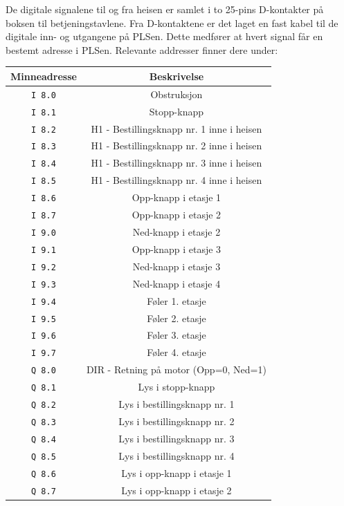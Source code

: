 \begin{alphasection}
De digitale signalene til og fra heisen er samlet i to 25-pins D-kontakter på boksen til
betjeningstavlene. Fra D-kontaktene er det laget en fast kabel til de digitale inn- og utgangene
på PLSen. Dette medfører at hvert signal får en bestemt adresse i PLSen. Relevante addresser finner dere under:


\begin{center}
 {\begin{tabular}{|c| c|} 
 \hline
 \textbf{Minneadresse} & \textbf{Beskrivelse} \\ 
 \toprule
 \verb|I 8.0| & Obstruksjon \\ 
 \hline
 \verb|I 8.1| & Stopp-knapp \\ 
 \hline
 \verb|I 8.2| & H1 - Bestillingsknapp nr. 1 inne i heisen \\ 
 \hline
 \verb|I 8.3| & H1 - Bestillingsknapp nr. 2 inne i heisen \\ 
 \hline
 \verb|I 8.4| & H1 - Bestillingsknapp nr. 3 inne i heisen \\ 
 \hline
 \verb|I 8.5| & H1 - Bestillingsknapp nr. 4 inne i heisen \\ 
 \hline
 \verb|I 8.6| & Opp-knapp i etasje 1 \\ 
 \hline
 \verb|I 8.7| & Opp-knapp i etasje 2 \\ 
 \toprule
 
 \verb|I 9.0| & Ned-knapp i etasje 2 \\ 
 \hline
 \verb|I 9.1| & Opp-knapp i etasje 3 \\ 
 \hline
 \verb|I 9.2| & Ned-knapp i etasje 3\\ 
 \hline
 \verb|I 9.3| & Ned-knapp i etasje 4 \\ 
 \hline
 \verb|I 9.4| & Føler 1. etasje \\ 
 \hline
 \verb|I 9.5| & Føler 2. etasje \\ 
 \hline
 \verb|I 9.6| & Føler 3. etasje \\ 
 \hline
 \verb|I 9.7| & Føler 4. etasje \\ 
 \toprule
 
 \verb|Q 8.0| & DIR - Retning på motor (Opp=0, Ned=1) \\ 
 \hline
 \verb|Q 8.1| & Lys i stopp-knapp \\ 
 \hline
 \verb|Q 8.2| & Lys i bestillingsknapp nr. 1 \\ 
 \hline
 \verb|Q 8.3| & Lys i bestillingsknapp nr. 2 \\ 
 \hline
 \verb|Q 8.4| & Lys i bestillingsknapp nr. 3\\ 
 \hline
 \verb|Q 8.5| & Lys i bestillingsknapp nr. 4\\ 
 \hline
 \verb|Q 8.6| & Lys i opp-knapp i etasje 1 \\ 
 \hline
 \verb|Q 8.7| & Lys i opp-knapp i etasje 2 \\ 
 \toprule
 

\end{tabular}}
\end{center}
\end{alphasection}
